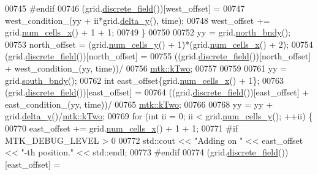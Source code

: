 \begin{DoxyCode}
00745 \textcolor{preprocessor}{      #endif}
00746       (grid.\hyperlink{classmtk_1_1UniStgGrid2D_a3e72d59843a3f9c5e47da07e5850dfe0}{discrete\_field}())[west\_offset] =
00747         west\_condition\_(yy + ii*grid.\hyperlink{classmtk_1_1UniStgGrid2D_a65a78cfc80ffdbeb282ed57af4dc5cb4}{delta\_y}(), time);
00748       west\_offset += grid.\hyperlink{classmtk_1_1UniStgGrid2D_a2d182866a398aba8e4829590e85bf939}{num\_cells\_x}() + 1 + 1;
00749     \}
00750 
00752     yy = grid.\hyperlink{classmtk_1_1UniStgGrid2D_afe1ead253cdeb5503e0489eba8fd84e2}{north\_bndy}();
00753     north\_offset = (grid.\hyperlink{classmtk_1_1UniStgGrid2D_aed05a801cc9a76dba0ff203cea58a61a}{num\_cells\_y}() + 1)*(grid.\hyperlink{classmtk_1_1UniStgGrid2D_a2d182866a398aba8e4829590e85bf939}{num\_cells\_x}() + 2);
00754     (grid.\hyperlink{classmtk_1_1UniStgGrid2D_a3e72d59843a3f9c5e47da07e5850dfe0}{discrete\_field}())[north\_offset] =
00755       ((grid.\hyperlink{classmtk_1_1UniStgGrid2D_a3e72d59843a3f9c5e47da07e5850dfe0}{discrete\_field}())[north\_offset] + west\_condition\_(yy, time))/
00756         \hyperlink{group__c01-roots_gaf39c2d851a2db744f4feb1c5ab3ec2cf}{mtk::kTwo};
00757 
00759 
00761     yy = grid.\hyperlink{classmtk_1_1UniStgGrid2D_a1442eaf219f099d0ebf46a170fdebf92}{south\_bndy}();
00762     \textcolor{keywordtype}{int} east\_offset\{grid.\hyperlink{classmtk_1_1UniStgGrid2D_a2d182866a398aba8e4829590e85bf939}{num\_cells\_x}() + 1\};
00763     (grid.\hyperlink{classmtk_1_1UniStgGrid2D_a3e72d59843a3f9c5e47da07e5850dfe0}{discrete\_field}())[east\_offset] =
00764       ((grid.\hyperlink{classmtk_1_1UniStgGrid2D_a3e72d59843a3f9c5e47da07e5850dfe0}{discrete\_field}())[east\_offset] + east\_condition\_(yy, time))/
00765         \hyperlink{group__c01-roots_gaf39c2d851a2db744f4feb1c5ab3ec2cf}{mtk::kTwo};
00766 
00768     yy = yy + grid.\hyperlink{classmtk_1_1UniStgGrid2D_a65a78cfc80ffdbeb282ed57af4dc5cb4}{delta\_y}()/\hyperlink{group__c01-roots_gaf39c2d851a2db744f4feb1c5ab3ec2cf}{mtk::kTwo};
00769     \textcolor{keywordflow}{for} (\textcolor{keywordtype}{int} ii = 0; ii < grid.\hyperlink{classmtk_1_1UniStgGrid2D_aed05a801cc9a76dba0ff203cea58a61a}{num\_cells\_y}(); ++ii) \{
00770       east\_offset += grid.\hyperlink{classmtk_1_1UniStgGrid2D_a2d182866a398aba8e4829590e85bf939}{num\_cells\_x}() + 1 + 1;
00771 \textcolor{preprocessor}{      #if MTK\_DEBUG\_LEVEL > 0}
00772       std::cout << \textcolor{stringliteral}{"Adding on "} << east\_offset << \textcolor{stringliteral}{"-th position."} << std::endl;
00773 \textcolor{preprocessor}{      #endif}
00774       (grid.\hyperlink{classmtk_1_1UniStgGrid2D_a3e72d59843a3f9c5e47da07e5850dfe0}{discrete\_field}())[east\_offset] =

\end{DoxyCode}
